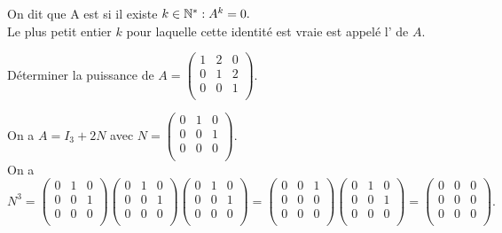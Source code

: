 \documentclass{book}
\begin{document}
\begin{Definition}
On dit que A est  si il existe  $k\in \mathbb{N}^* : A^k = 0.$\\
Le plus petit entier $k$ pour laquelle cette identité est vraie est appelé l' de $A$.
\end{Definition}
\begin{Exemple}
Déterminer la puissance de $A=\begin{pmatrix}
1&2&0\\
0& 1&2\\
0&0 &1\\
\end{pmatrix}$.
\begin{Demonstration}
On a $A=I_3+2N$ avec $N=\begin{pmatrix}
0&1&0\\
0& 0&1\\
0&0 &0\\
\end{pmatrix}$.\\
On a $$N^3=\begin{pmatrix}
0&1&0\\
0& 0&1\\
0&0 &0\\
\end{pmatrix}\begin{pmatrix}
0&1&0\\
0& 0&1\\
0&0 &0\\
\end{pmatrix}\begin{pmatrix}
0&1&0\\
0& 0&1\\
0&0 &0\\
\end{pmatrix} = \begin{pmatrix}
0&0&1\\
0& 0&0\\
0&0 &0\\
\end{pmatrix}\begin{pmatrix}
0&1&0\\
0& 0&1\\
0&0 &0\\
\end{pmatrix}=\begin{pmatrix}
0&0&0\\
0& 0&0\\
0&0 &0\\
\end{pmatrix}.$$

\end{Demonstration}
\end{Exemple}
\end{document}
